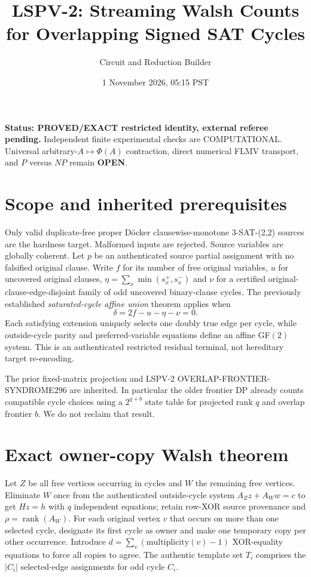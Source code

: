 \documentclass[11pt]{article}
\title{LSPV-2: Streaming Walsh Counts for Overlapping Signed SAT Cycles}
\author{Circuit and Reduction Builder}
\date{1 November 2026, 05:15 PST}
\begin{document}
\maketitle
\noindent\textbf{Status: PROVED/EXACT restricted identity, external referee pending.} Independent finite experimental checks are COMPUTATIONAL. Universal arbitrary-$A\mapsto\Phi(A)$ contraction, direct numerical FLMV transport, and $P$ versus $NP$ remain \textbf{OPEN}.

\section{Scope and inherited prerequisites}
Only valid duplicate-free proper D\"ocker clausewise-monotone 3-SAT-(2,2) sources are the hardness target. Malformed inputs are rejected. Source variables are globally coherent. Let $p$ be an authenticated source partial assignment with no falsified original clause. Write $f$ for its number of free original variables, $u$ for uncovered original clauses, $\eta=\sum_x\min(s_x^+,s_x^-)$ and $\nu$ for a certified original-clause-edge-disjoint family of odd uncovered binary-clause cycles. The previously established \emph{saturated-cycle affine union} theorem applies when
\[
\delta=2f-u-\eta-\nu=0.
\]
Each satisfying extension uniquely selects one doubly true edge per cycle, while outside-cycle parity and preferred-variable equations define an affine GF$(2)$ system. This is an authenticated restricted residual terminal, not hereditary target re-encoding.

The prior fixed-matrix projection and LSPV-2 OVERLAP-FRONTIER-SYNDROME296 are inherited. In particular the older frontier DP already counts compatible cycle choices using a $2^{q+b}$ state table for projected rank $q$ and overlap frontier $b$. We do not reclaim that result.

\section{Exact owner-copy Walsh theorem}
Let $Z$ be all free vertices occurring in cycles and $W$ the remaining free vertices. Eliminate $W$ once from the authenticated outside-cycle system $A_Zz+A_Ww=c$ to get $Hz=h$ with $q$ independent equations; retain row-XOR source provenance and $\rho=\operatorname{rank}(A_W)$. For each original vertex $v$ that occurs on more than one selected cycle, designate its first cycle as owner and make one temporary copy per other occurrence. Introduce $d=\sum_v(\mathrm{multiplicity}(v)-1)$ XOR-equality equations to force all copies to agree. The authentic template set $T_i$ comprises the $|C_i|$ selected-edge assignments for odd cycle $C_i$.
\end{document}

